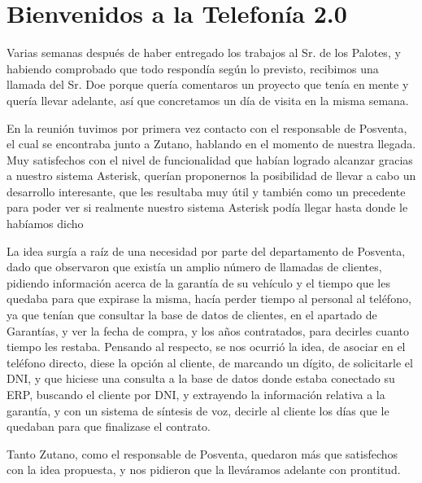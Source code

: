 
\newpage

\color[rgb]{0,0,1}

\section{Bienvenidos a la Telefonía 2.0}

Varias semanas después de haber entregado los trabajos al Sr. de los Palotes, y habiendo comprobado que todo respondía según lo previsto, recibimos una llamada del Sr. Doe porque quería comentaros un proyecto que tenía en mente y quería llevar adelante, así que concretamos un día de visita en la misma semana.

En la reunión tuvimos por primera vez contacto con el responsable de Posventa, el cual se encontraba junto a Zutano, hablando en el momento de nuestra llegada. Muy satisfechos con el nivel de funcionalidad que habían logrado alcanzar gracias a nuestro sistema Asterisk, querían proponernos la posibilidad de llevar a cabo un desarrollo interesante, que les resultaba muy útil y también como un precedente para poder ver si realmente nuestro sistema Asterisk podía llegar hasta donde le habíamos dicho

La idea surgía a raíz de una necesidad por parte del departamento de Posventa, dado que observaron que existía un amplio número de llamadas de clientes, pidiendo información acerca de la garantía de su vehículo y el tiempo que les quedaba para que expirase la misma, hacía perder tiempo al personal al teléfono, ya que tenían que consultar la base de datos de clientes, en el apartado de Garantías, y ver la fecha de compra, y los años contratados, para decirles cuanto tiempo les restaba. Pensando al respecto, se nos ocurrió la idea, de asociar en el teléfono directo, diese la opción al cliente, de marcando un dígito, de solicitarle el DNI, y que hiciese una consulta a la base de datos donde estaba conectado su ERP, buscando el cliente por DNI, y extrayendo la información relativa a la garantía, y con un sistema de síntesis de voz, decirle al cliente los días que le quedaban para que finalizase el contrato.

Tanto Zutano, como el responsable de Posventa, quedaron más que satisfechos con la idea propuesta, y nos pidieron que la lleváramos adelante con prontitud.

